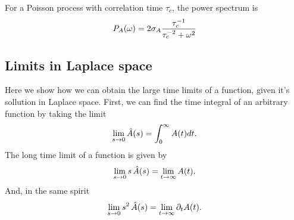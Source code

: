 For a Poisson process with correlation time $\tau_c$, the power spectrum is
\begin{equation}
 P_A(\omega) = 2 \sigma_A \frac{\tau_c^{-1}}{\tau_c^{-2} + \omega^2}
 \elabel{PoissonPow}
\end{equation}


\subsection{ Limits in Laplace space}
Here we show how we can obtain the large time limits of a function, given it's sollution in Laplace space. First, we can find the time integral of an arbitrary function by taking the limit
\begin{align}
\lim_{s \to 0} \hat{A}(s) = \int_0^\infty A(t) dt.
\elabel{si:int_vs_lap}
\end{align}
The long time limit of a function is given by
\begin{align}
\lim_{s \to 0} s \, \hat{A}(s) = \lim_{t \to \infty} A(t).
\elabel{si:longt_in_lap}
\end{align}
And, in the same spirit
\begin{align}
\lim_{s \to 0} s^2 \, \hat{A}(s) = \lim_{t \to \infty} \partial_t A(t).
\elabel{si:longt_in_lap2}
\end{align}


